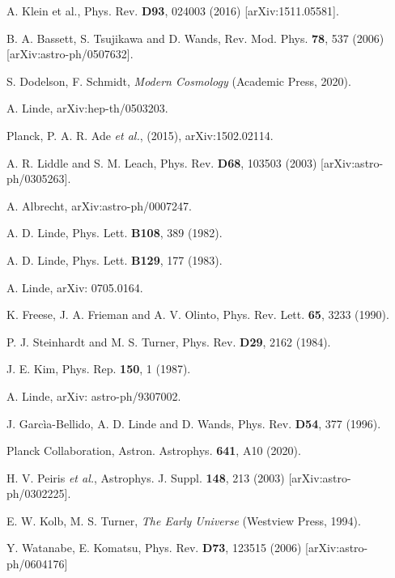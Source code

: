 \documentclass[11pt,a4paper,twoside]{book}
\begin{document}
\begin{thebibliography}{2}
	 A. Klein et al., Phys. Rev. \textbf{D93}, 024003 (2016) [arXiv:1511.05581].
	
	 B. A. Bassett, S. Tsujikawa and D. Wands, Rev. Mod. Phys. \textbf{78}, 537 (2006) [arXiv:astro-ph/0507632].
	
	 S. Dodelson, F. Schmidt, \emph{Modern Cosmology} (Academic Press, 2020).
	
	 A. Linde, arXiv:hep-th/0503203.
	
	 Planck, P. A. R. Ade \textit{et al.}, (2015), arXiv:1502.02114.
	
	 A. R. Liddle and S. M. Leach, Phys. Rev. \textbf{D68}, 103503 (2003) [arXiv:astro-ph/0305263].
	
	 A. Albrecht, arXiv:astro-ph/0007247.
	
	 A. D. Linde, Phys. Lett. \textbf{B108}, 389 (1982).
	
	 A. D. Linde, Phys. Lett. \textbf{B129}, 177  (1983).  
	
	 A. Linde, arXiv: 0705.0164. 
	
	 K. Freese, J. A. Frieman and A. V. Olinto, Phys. Rev. Lett. \textbf{65}, 3233 (1990).
	
	 P. J. Steinhardt and M. S. Turner, Phys. Rev. \textbf{D29}, 2162 (1984).
	
	 J. E. Kim, Phys. Rep. \textbf{150}, 1 (1987).
	
	 A. Linde, arXiv: astro-ph/9307002.
	
	 J. Garcìa-Bellido, A. D. Linde and D. Wands, Phys. Rev. \textbf{D54}, 377 (1996).
	
	 Planck Collaboration, Astron. Astrophys. \textbf{641}, A10 (2020).
	
	 H. V. Peiris \textit{et al.}, Astrophys. J. Suppl. \textbf{148}, 213 (2003) [arXiv:astro-ph/0302225].
	
	 E. W. Kolb, M. S. Turner, \textit{The Early Universe} (Westview Press, 1994).
	
	 Y. Watanabe, E. Komatsu, Phys. Rev. \textbf{D73}, 123515 (2006) [arXiv:astro-ph/0604176]
	

\end{thebibliography}
\end{document}
